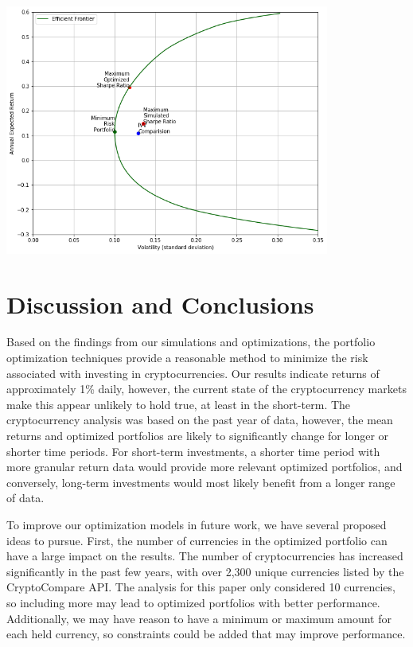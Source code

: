 \documentclass[11pt]{article} %
\begin{document}
\includegraphics[width=0.8\textwidth]{sp1}
 
\section{Discussion and Conclusions}

Based on the findings from our simulations and optimizations, the portfolio optimization techniques provide a reasonable method to minimize the risk associated with investing in cryptocurrencies. Our results indicate returns of approximately 1\% daily, however, the current state of the cryptocurrency markets make this appear unlikely to hold true, at least in the short-term. The cryptocurrency analysis was based on the past year of data, however, the mean returns and optimized portfolios are likely to significantly change for longer or shorter time periods. For short-term investments, a shorter time period with more granular return data would provide more relevant optimized portfolios, and conversely, long-term investments would most likely benefit from a longer range of data.

To improve our optimization models in future work, we have several proposed ideas to pursue. First, the number of currencies in the optimized portfolio can have a large impact on the results. The number of cryptocurrencies has increased significantly in the past few years, with over 2,300 unique currencies listed by the CryptoCompare API. The analysis for this paper only considered 10 currencies, so including more may lead to optimized portfolios with better performance. Additionally, we may have reason to have a minimum or maximum amount for each held currency, so constraints could be added that may improve performance.
\end{document}
